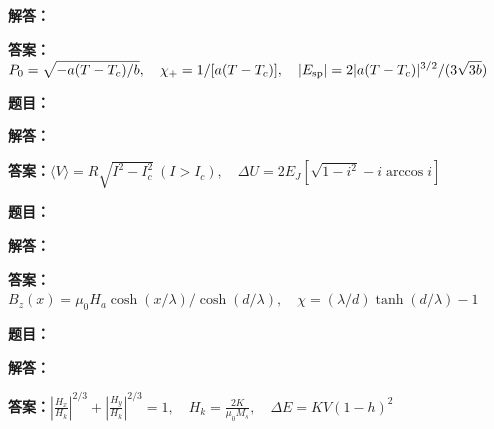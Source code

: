 \documentclass[lang=cn,color=blue,11pt]{elegantbook}
\begin{document}
\par\noindent\textbf{解答：}
\par\noindent\textbf{答案：}\(\displaystyle P_0=\sqrt{-a(T-T_c)/b},\quad \chi_+=1/[a(T-T_c)],\quad |E_{\rm sp}|=2|a(T-T_c)|^{3/2}/(3\sqrt{3b})\)\par
\par\smallskip\noindent\hrulefill\par\medskip
{}\par
\noindent\textbf{题目：}
\par\noindent\textbf{解答：}
\par\noindent\textbf{答案：}\(\displaystyle \langle V\rangle=R\sqrt{I^2-I_c^2}\ (I>I_c),\quad \Delta U=2E_J[\sqrt{1-i^2}-i\arccos i]\)\par
\par\smallskip\noindent\hrulefill\par\medskip
{}\par
\noindent\textbf{题目：}
\par\noindent\textbf{解答：}
\par\noindent\textbf{答案：}\(\displaystyle B_z(x)=\mu_0H_a\cosh(x/\lambda)/\cosh(d/\lambda),\quad \chi=(\lambda/d)\tanh(d/\lambda)-1\)\par
\par\smallskip\noindent\hrulefill\par\medskip
{}\par
\noindent\textbf{题目：}
\par\noindent\textbf{解答：}
\par\noindent\textbf{答案：}\(\displaystyle \left|\frac{H_x}{H_k}\right|^{2/3}+\left|\frac{H_y}{H_k}\right|^{2/3}=1,\quad H_k=\frac{2K}{\mu_0M_s},\quad\Delta E=KV(1-h)^2\)\par
\par\smallskip\noindent\hrulefill\par\medskip
{}\par
\end{document}
